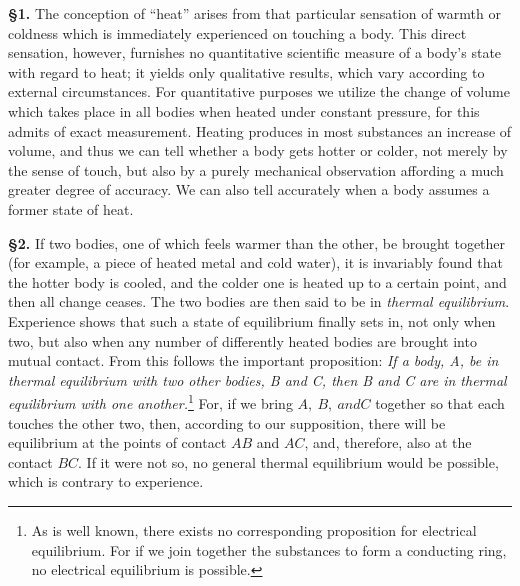 \documentclass[oneside,12pt]{book}
\newcommand{\iit}[1]{\textit{#1}}
\begin{document}
\textbf{\S 1.} The conception of ``heat'' arises from that particular sensation of warmth or coldness which is immediately experienced on touching a body. This direct sensation, however, furnishes no quantitative scientific measure of a body's state with regard to heat; it yields only qualitative results, which vary according to external circumstances. For quantitative purposes we utilize the change of volume which takes place in all bodies when heated under constant pressure, for this admits of exact measurement. Heating produces in most substances an increase of volume, and thus we can tell whether a body gets hotter or colder, not merely by the sense of touch, but also by a purely mechanical observation affording a much greater degree of accuracy. We can also tell accurately when a body assumes a former state of heat. \par 

\textbf{\S 2.} If two bodies, one of which feels warmer than the other, be brought together (for example, a piece of heated metal and cold water), it is invariably found that the hotter body is cooled, and the colder one is heated up to a certain point, and then all change ceases. The two bodies are then said to be in \iit{thermal equilibrium}. Experience shows that such a state of equilibrium finally sets in, not only when two, but also when any number of differently heated bodies are brought into mutual contact. From this follows the important proposition: \iit{If a body, A, be in thermal equilibrium with two other bodies, B and C, then B and C are in thermal equilibrium with one another.}\footnote[1]{As is well known, there exists no corresponding proposition for electrical equilibrium. For if we join together the substances  to form a conducting ring, no electrical equilibrium is possible.} For, if we bring $A,\ B,\ and C$ together so that each touches the other two, then, according to our supposition, there will be equilibrium at the points of contact $AB$ and $AC$, and, therefore, also at the contact $BC$. If it were not so, no general thermal equilibrium would be possible, which is contrary to experience. \par 
\end{document}
